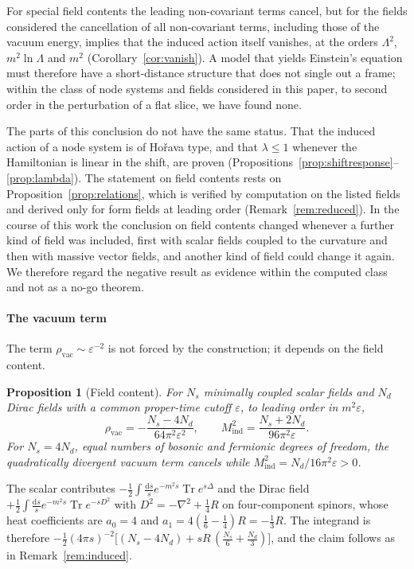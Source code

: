 \documentclass[11pt,a4paper]{article}
\makeatletter
\theoremstyle{stmt}
\newtheorem{proposition}[theorem]{Proposition}
\theoremstyle{defn}
\theoremstyle{rmk}
\renewenvironment{proof}[1][\proofname]{\par\pushQED{\qed}\normalfont\topsep6\p@\@plus6\p@\relax
  \trivlist\item[\hskip\labelsep{\sffamily\itshape\small #1.}]\ignorespaces}{\popQED\endtrivlist\@endpefalse}
\numberwithin{equation}{section}
\DeclareMathOperator{\Tr}{Tr}
\newcommand{\dd}{\mathrm{d}}
\makeatother
\begin{document}
For special field contents the leading non-covariant terms cancel, but for the fields considered the cancellation of all non-covariant terms, including those of the vacuum energy, implies that the induced action itself vanishes, at the orders $\Lambda^2$, $m^2\ln\Lambda$ and $m^2$ (Corollary~\ref{cor:vanish}). A model that yields Einstein's equation must therefore have a short-distance structure that does not single out a frame; within the class of node systems and fields considered in this paper, to second order in the perturbation of a flat slice, we have found none.

The parts of this conclusion do not have the same status. That the induced action of a node system is of Ho\v{r}ava type, and that $\lambda\le1$ whenever the Hamiltonian is linear in the shift, are proven (Propositions~\ref{prop:shiftresponse}--\ref{prop:lambda}). The statement on field contents rests on Proposition~\ref{prop:relations}, which is verified by computation on the listed fields and derived only for form fields at leading order (Remark~\ref{rem:reduced}). In the course of this work the conclusion on field contents changed whenever a further kind of field was included, first with scalar fields coupled to the curvature and then with massive vector fields, and another kind of field could change it again. We therefore regard the negative result as evidence within the computed class and not as a no-go theorem.

\paragraph{The vacuum term} The term $\rho_{\mathrm{vac}}\sim\varepsilon^{-2}$ is not forced by the construction; it depends on the field content.

\begin{proposition}[Field content]\label{prop:vacuum}
For $N_s$ minimally coupled scalar fields and $N_d$ Dirac fields with a common proper-time cutoff $\varepsilon$, to leading order in $m^2\varepsilon$,
\begin{equation}
\rho_{\mathrm{vac}}=-\frac{N_s-4N_d}{64\pi^2\varepsilon^2},\qquad M_{\mathrm{ind}}^2=\frac{N_s+2N_d}{96\pi^2\varepsilon}.
\end{equation}
For $N_s=4N_d$, equal numbers of bosonic and fermionic degrees of freedom, the quadratically divergent vacuum term cancels while $M_{\mathrm{ind}}^2=N_d/16\pi^2\varepsilon>0$.
\end{proposition}

\begin{proof}
The scalar contributes $-\tfrac12\int\frac{\dd s}{s}e^{-m^2s}\Tr e^{s\Delta}$ and the Dirac field $+\tfrac12\int\frac{\dd s}{s}e^{-m^2s}\Tr e^{-sD^2}$ with $D^2=-\nabla^2+\tfrac14R$ on four-component spinors, whose heat coefficients are $a_0=4$ and $a_1=4(\tfrac16-\tfrac14)R=-\tfrac13R$. The integrand is therefore $-\tfrac12(4\pi s)^{-2}\big[(N_s-4N_d)+sR\,(\tfrac{N_s}6+\tfrac{N_d}3)\big]$, and the claim follows as in Remark~\ref{rem:induced}.
\end{proof}
\end{document}
